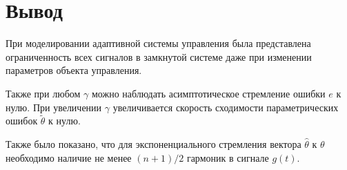 \documentclass[14pt, a4paper]{extarticle}
\begin{document}
	\newpage
	
	\section*{Вывод}
	
	При моделировании адаптивной системы управления была представлена ограниченность всех сигналов в замкнутой системе даже при изменении параметров объекта управления.
	
	Также при любом $\gamma$ можно наблюдать асимптотическое стремление ошибки $e$ к нулю. При увеличении $\gamma$ увеличивается скорость сходимости параметрических ошибок $\tilde{\theta}$ к нулю.
	
	Также было показано, что для экспоненциального стремления вектора $\hat{\theta}$ к $\theta$ необходимо наличие не менее $(n+1)/2$ гармоник в сигнале $g(t)$.
	
	
\end{document}
